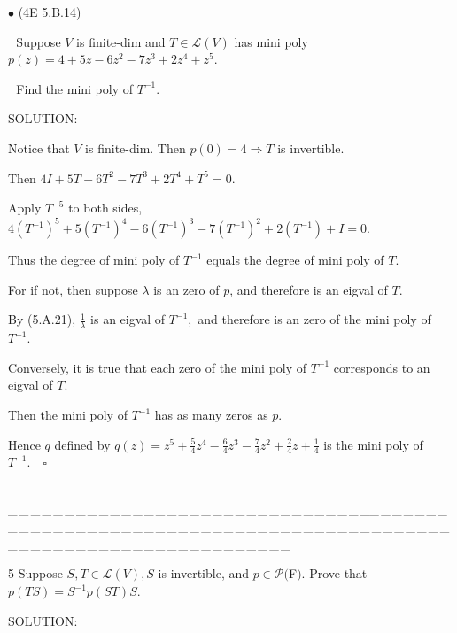 \documentclass[a4paper, 11pt, UTF8]{article}
\def\Lm{\mathcal{L}}
\def\Po{\mathcal{P}}
\begin{document}
\begin{large}
{\small $\bullet$} (\normalsize{4E 5.B.14})\par\,\, {\timessl\Large 
Suppose $V$ is finite-dim and $T\in \Lm(V)$ has mini poly
$p(z)=4 + 5z - 6z^2 - 7z^3 + 2z^4 + z^5$.}\par\,\,
{\timessl\Large Find the mini poly of $T^{-1}$.}\par
{\timesbf S\footnotesize{OLUTION:}}\par\quad
Notice that $V$ is finite-dim. Then $p(0)=4\Rightarrow T$ is invertible.\par\quad
Then $4I+5T-6T^2-7T^3+2T^4+T^5=0.$\par\quad
Apply $T^{-5}$ to both sides, $4(T^{-1})^5+5(T^{-1})^4-6(T^{-1})^3-7(T^{-1})^2+2(T^{-1})+I=0.$\par\quad
Thus the degree of mini poly of $T^{-1}$ equals the degree of mini poly of $T.$\par\quad
For if not, then suppose $\lambda$ is an zero of $p$, and therefore is an eigval of $T$.\par\quad By (5.A.21), $\frac{1}{\lambda}$ is an eigval of $T^{-1},$ and therefore is an zero of the mini poly of $T^{-1}.$\par\quad
Conversely, it is true that each zero of the mini poly of $T^{-1}$ corresponds to an eigval of $T.$\par\quad 
Then the mini poly of $T^{-1}$ has as many zeros as $p.$\par\quad
Hence $q$ defined by $q(z)=z^{5}+\frac{5}{4}z^{4}-\frac{6}{4}z^{3}-\frac{7}{4}z^{2}+\frac{2}{4}z+\frac{1}{4}$ is the mini poly of $T^{-1}.\quad\square$
\par
{\tiny \_\,\_\,\_\,\_\,\_\,\_\,\_\,\_\,\_\,\_\,\_\,\_\,\_\,\_\,\_\,\_\,\_\,\_\,\_\,\_\,\_\,\_\,\_\,\_\,\_\,\_\,\_\,\_\,\_\,\_\,\_\,\_\,\_\,\_\,\_\,\_\,\_\,\_\,\_\,\_\,\_\,\_\,\_\,\_\,\_\,\_\,\_\,\_\,\_\,\_\,\_\,\_\,\_\,\_\,\_\,\_\,\_\,\_\,\_\,\_\,\_\,\_\,\_\,\_\,\_\,\_\,\_\,\_\,\_\,\_\,\_\_\,\_\,\_\,\_\,\_\,\_\,\_\,\_\,\_\,\_\,\_\,\_\,\_\,\_\,\_\,\_\,\_\,\_\,\_\,\_\,\_\,\_\,\_\,\_\,\_\,\_\,\_\,\_\,\_\,\_\,\_\,\_\,\_\,\_\,\_\,\_\,\_\,\_\,\_\,\_\,\_\,\_\,\_\,\_\,\_\,\_\,\_\,\_\,\_\,\_\,\_\,\_\,\_\,\_\,\_\,\_\,\_\,\_\,\_\,\_\,\_\,\_\,\_\,\_\,\_\,\_\,\_\,\_\,\_\,\_\,\_}\par

{\timesbf\Large 5} {\timessl\Large 
Suppose $S,T\in\Lm(V),S$ is invertible, and $p\in\Po(${\timesbf F}$)$. Prove that $p(TS) = S^{-1} p(ST)S.$
}\par
{\timesbf S\footnotesize{OLUTION:}}\par\quad


\end{large}
\end{document}
